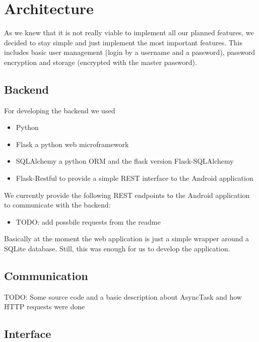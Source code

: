 \documentclass{report}
\begin{document}
\section{Architecture}

As we knew that it is not really viable to implement all our planned features, we decided to stay simple and just implement the most important features. This includes basic user management (login by a username and a password), password encryption and storage (encrypted with the master password).

\subsection{Backend}
For developing the backend we used
\begin{itemize}
	\item Python \cite{Python}
	\item Flask \cite{Flask} a python web microframework
	\item SQLAlchemy \cite{SQLAlchemy} a python ORM and the flask version Flask-SQLAlchemy \cite{FlaskSQLAlchemy}
	\item Flask-Restful \cite{Flask-Restful} to provide a simple REST interface to the Android application
\end{itemize}

We currently provide the following REST endpoints to the Android application to communicate with the backend:

\begin{itemize}
	\item TODO: add possbile requests from the readme
\end{itemize}

Basically at the moment the web application is just a simple wrapper around a SQLite database. Still, this was enough for us to develop the application.

\subsection{Communication}

TODO: Some source code and a basic description about AsyncTask and how HTTP requests were done







\subsection{Interface}
\end{document}

